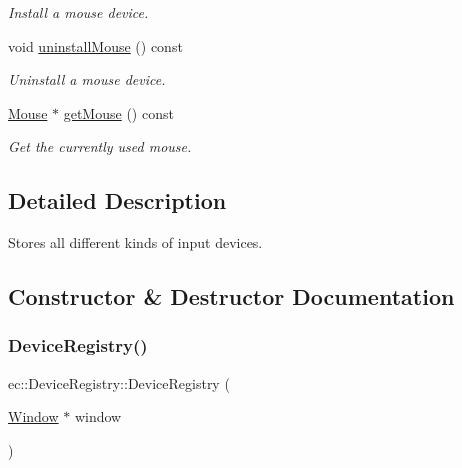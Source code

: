 \begin{DoxyCompactItemize}
\begin{DoxyCompactList}\small\item\em Install a mouse device. \end{DoxyCompactList}\item 
void \mbox{\hyperlink{classec_1_1_device_registry_a18bc5f140735a3f9abd453b89f472f2a}{uninstall\+Mouse}} () const
\begin{DoxyCompactList}\small\item\em Uninstall a mouse device. \end{DoxyCompactList}\item 
\mbox{\hyperlink{classec_1_1_mouse}{Mouse}} $\ast$ \mbox{\hyperlink{classec_1_1_device_registry_a53b0c5d23c851c63ef97529658cd126d}{get\+Mouse}} () const
\begin{DoxyCompactList}\small\item\em Get the currently used mouse. \end{DoxyCompactList}\end{DoxyCompactItemize}


\subsection{Detailed Description}
Stores all different kinds of input devices. 

\subsection{Constructor \& Destructor Documentation}
\mbox{\label{classec_1_1_device_registry_adbe0912caca04d8c401f58b57dc11524}} 
\subsubsection{\texorpdfstring{Device\+Registry()}{DeviceRegistry()}}
{\footnotesize\ttfamily ec\+::\+Device\+Registry\+::\+Device\+Registry (\begin{DoxyParamCaption}\item[{\mbox{\hyperlink{classec_1_1_window}{Window}} $\ast$}]{window }\end{DoxyParamCaption})\hspace{0.3cm}{\ttfamily [explicit]}}

\mbox{\label{classec_1_1_device_registry_a75dff0df1527fe9d7e75b25f3dff4028}} 
